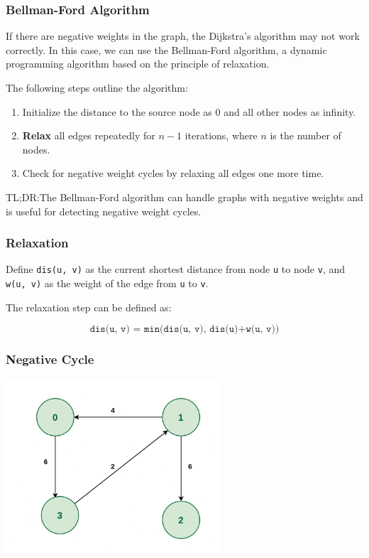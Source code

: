 \documentclass[xcolor=dvipsnames]{beamer}
\begin{document}
    \begin{frame}
        \frametitle{Bellman-Ford Algorithm}
        If there are negative weights in the graph, the Dijkstra's algorithm may not work correctly.
        In this case, we can use the Bellman-Ford algorithm, 
        a dynamic programming algorithm based on the principle of relaxation.

      
        The following steps outline the algorithm:
        \begin{enumerate}
            \item Initialize the distance to the source node as 0 and all other nodes as infinity.
            \item \textbf{Relax} all edges repeatedly for $n-1$ iterations, where $n$ is the number of nodes.
            \item Check for negative weight cycles by relaxing all edges one more time.
        \end{enumerate}
        \vspace{0.5cm}
        TL;DR:The Bellman-Ford algorithm can handle graphs with negative weights and is useful for detecting negative weight cycles.
    \end{frame}

    \begin{frame}
        \frametitle{Relaxation}
        Define \texttt{dis(u, v)} as the current shortest distance from node \texttt{u} to node \texttt{v}, 
        and \texttt{w(u, v)} as the weight of the edge from \texttt{u} to \texttt{v}. 

        The relaxation step can be defined as:
        
        \begin{equation*}
            \texttt{dis(u, v) = min(dis(u, v), dis(u)+w(u, v))}
        \end{equation*}
    \end{frame}
    
    \begin{frame}
        \frametitle{Negative Cycle}
        \begin{center}
            \includegraphics[width=0.6\textwidth]{src/negative-cycle.png}
        \end{center}
    \end{frame}
\end{document}
